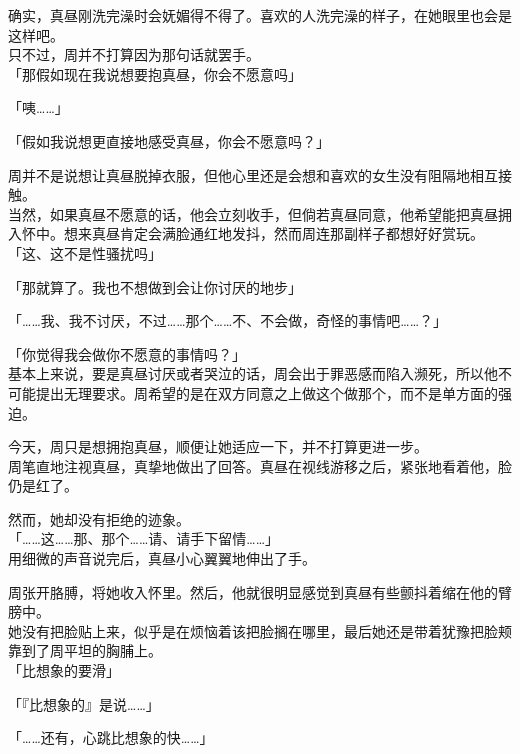 确实，真昼刚洗完澡时会妩媚得不得了。喜欢的人洗完澡的样子，在她眼里也会是这样吧。\\

只不过，周并不打算因为那句话就罢手。\\

「那假如现在我说想要抱真昼，你会不愿意吗」

「咦……」

「假如我说想更直接地感受真昼，你会不愿意吗？」

周并不是说想让真昼脱掉衣服，但他心里还是会想和喜欢的女生没有阻隔地相互接触。\\

当然，如果真昼不愿意的话，他会立刻收手，但倘若真昼同意，他希望能把真昼拥入怀中。想来真昼肯定会满脸通红地发抖，然而周连那副样子都想好好赏玩。\\

「这、这不是性骚扰吗」

「那就算了。我也不想做到会让你讨厌的地步」

「……我、我不讨厌，不过……那个……不、不会做，奇怪的事情吧……？」

「你觉得我会做你不愿意的事情吗？」\\

基本上来说，要是真昼讨厌或者哭泣的话，周会出于罪恶感而陷入濒死，所以他不可能提出无理要求。周希望的是在双方同意之上做这个做那个，而不是单方面的强迫。

今天，周只是想拥抱真昼，顺便让她适应一下，并不打算更进一步。\\

周笔直地注视真昼，真挚地做出了回答。真昼在视线游移之后，紧张地看着他，脸仍是红了。

然而，她却没有拒绝的迹象。\\

「……这……那、那个……请、请手下留情……」\\

用细微的声音说完后，真昼小心翼翼地伸出了手。

周张开胳膊，将她收入怀里。然后，他就很明显感觉到真昼有些颤抖着缩在他的臂膀中。\\

她没有把脸贴上来，似乎是在烦恼着该把脸搁在哪里，最后她还是带着犹豫把脸颊靠到了周平坦的胸脯上。\\

「比想象的要滑」

「『比想象的』是说……」

「……还有，心跳比想象的快……」\\

